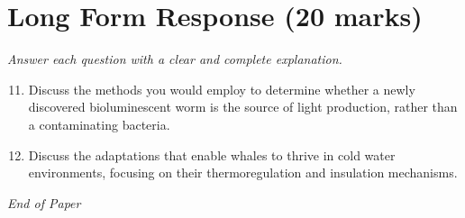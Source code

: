 \documentclass[12pt]{article}
\begin{document}
\section*{Long Form Response (20 marks)}
\textit{Answer each question with a clear and complete explanation.}
\begin{enumerate}[label=\arabic*.]
\setcounter{enumi}{10}
\item Discuss the methods you would employ to determine whether a newly discovered bioluminescent worm is the source of light production, rather than a contaminating bacteria.
\item Discuss the adaptations that enable whales to thrive in cold water environments, focusing on their thermoregulation and insulation mechanisms.
\end{enumerate}

\vfill
\noindent\textit{End of Paper}
\end{document}
